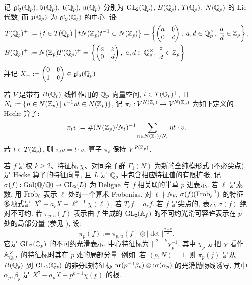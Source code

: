 记 $\mathfrak{gl}_2(\mathbb{Q}_p)$, $\mathfrak{b}(\mathbb{Q}_p)$, $\mathfrak{t}(\mathbb{Q}_p)$, $\mathfrak{n}(\mathbb{Q}_p)$ 分别为 $\mathrm{GL}_2(\mathbb{Q}_p)$, $B(\mathbb{Q}_p)$, $T(\mathbb{Q}_p)$, $N(\mathbb{Q}_p)$ 的 Lie 代数, 而 $\mathfrak{z}(\mathbb{Q}_p)$ 为 $\mathfrak{gl}_2(\mathbb{Q}_p)$ 的中心.
设:
\begin{align}
T(\mathbb{Q}_p)^{+} &:= \left\{ t \in T(\mathbb{Q}_p) \;\middle|\; tN(\mathbb{Z}_p)t^{-1} \subset N(\mathbb{Z}_p) \right\} = \left\{ \begin{pmatrix} a & 0 \\ 0 & d \end{pmatrix}, \; a,d \in \mathbb{Q}_p^{\times}, \; \frac{a}{d} \in \mathbb{Z}_p \right\},\\
B(\mathbb{Q}_p)^{+} &:= N(\mathbb{Z}_p)T(\mathbb{Q}_p)^{+} = \left\{ \begin{pmatrix} a & z \\ 0 & d \end{pmatrix}, \; a,d \in \mathbb{Q}_p^{\times}, \; \frac{z}{d} \in \mathbb{Z}_p \right\}
\end{align}
并记 $X_{-} := \begin{pmatrix} 0 & 0 \\ 1 & 0 \end{pmatrix} \in \mathfrak{gl}_2(\mathbb{Q}_p)$.

若 $V$ 是带有 $B(\mathbb{Q}_p)$ 线性作用的 $\mathbb{Q}_p$-向量空间, $t \in T(\mathbb{Q}_p)^{+}$, 且 $N_t := \{n \in N(\mathbb{Z}_p) \mid t^{-1}nt \in N(\mathbb{Z}_p)\}$, 记 $\pi_t : V^{N(\mathbb{Z}_p)} \to V^{N(\mathbb{Z}_p)}$ 为如下定义的 Hecke 算子:
\[
\pi_t v := \#(N(\mathbb{Z}_p)/N_t)^{-1} \sum_{n \in N(\mathbb{Z}_p)/N_t} nt \cdot v.
\]
若 $t \in T(\mathbb{Z}_p)$, 则 $\pi_t v = t \cdot v$.
算子 $\pi_t$ 保持 $V^{P(\mathbb{Z}_p)}$.

若 $f$ 是权 $k \ge 2$、特征标 $\chi$、对同余子群 $\Gamma_1(N)$ 为新的全纯模形式 (不必尖点), 是 Hecke 算子的特征向量, 且 $L$ 是 $\mathbb{Q}_p$ 中包含相应特征值的有限扩张, 记 $\sigma(f) : \operatorname{Gal}(\mathbb{Q}/\mathbb{Q}) \to \mathrm{GL}_2(L)$ 为 Deligne 与 $f$ 相关联的半单 $p$ 进表示.
若 $\ell$ 是素数, 用 $\operatorname{Frob}_{\ell}$ 表示 $\ell$ 处的一个算术 Frobenius.
对 $\ell \nmid Np$, $\sigma(f)(\operatorname{Frob}_{\ell}^{-1})$ 的特征多项式是 $X^2 - a_{\ell}X + \ell^{k-1}\chi(\ell)$, 若 $T_{\ell}f = a_{\ell}f$.
若 $f$ 是尖点的, 表示 $\sigma(f)$ 绝对不可约.
若 $\pi_{p,u}(f)$ 表示由 $f$ 生成的 $\mathrm{GL}_2(\mathbb{A}_f)$ 的不可约光滑可容许表示在 $p$ 处的局部分量 (参见 \cite[\S2.4]{ref:20}), 设:
\[
\pi_p(f) := \pi_{p,u}(f) \otimes |\det|^{\frac{2-k}{2}}.
\]
它是 $\mathrm{GL}_2(\mathbb{Q}_p)$ 的不可约光滑表示, 中心特征标为 $|\,|^{2-k}\chi_p^{-1}$, 其中 $\chi_p$ 是把 $\chi$ 看作 $\mathbb{A}_{\mathbb{Q},f}^{\times}$ 的特征标时其在 $p$ 处的局部分量.
例如, 若 $(p,N) = 1$, 则 $\pi_p(f)$ 是从 $B(\mathbb{Q}_p)$ 到 $\mathrm{GL}_2(\mathbb{Q}_p)$ 的非分歧特征标 $\operatorname{nr}(p^{-1}\beta_p) \otimes \operatorname{nr}(\alpha_p)$ 的光滑抛物线诱导, 其中 $\alpha_p,\beta_p$ 是 $X^2 - a_pX + p^{k-1}\chi(p)$ 的根.

